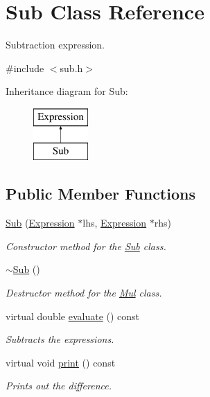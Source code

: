 \hypertarget{class_sub}{}\section{Sub Class Reference}
\label{class_sub}


Subtraction expression.  




{\ttfamily \#include $<$sub.\+h$>$}

Inheritance diagram for Sub\+:\begin{figure}[H]
\begin{center}
\leavevmode
\includegraphics[height=2.000000cm]{class_sub}
\end{center}
\end{figure}
\subsection*{Public Member Functions}
\begin{DoxyCompactItemize}
\item 
\hyperlink{class_sub_a546d43098de078f66bc615544770133e}{Sub} (\hyperlink{class_expression}{Expression} $\ast$lhs, \hyperlink{class_expression}{Expression} $\ast$rhs)
\begin{DoxyCompactList}\small\item\em Constructor method for the \hyperlink{class_sub}{Sub} class. \end{DoxyCompactList}\item 
\hyperlink{class_sub_a01d5069c4d640cc4e6016a4794e435a5}{$\sim$\+Sub} ()
\begin{DoxyCompactList}\small\item\em Destructor method for the \hyperlink{class_mul}{Mul} class. \end{DoxyCompactList}\item 
virtual double \hyperlink{class_sub_a15b87b081136f533a993a92ac01ec11b}{evaluate} () const
\begin{DoxyCompactList}\small\item\em Subtracts the expressions. \end{DoxyCompactList}\item 
virtual void \hyperlink{class_sub_a2e7c967c1fdee5e7eca51ca36feb26bc}{print} () const
\begin{DoxyCompactList}\small\item\em Prints out the difference. \end{DoxyCompactList}\end{DoxyCompactItemize}


